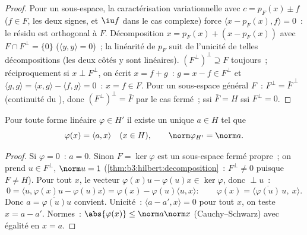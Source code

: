 \begin{proof}
Pour un sous-espace, la caractérisation variationnelle avec $c
= p_F(x) \pm f$ ($f \in F$, les deux signes, et $\iu f$ dans le
cas complexe) force $\langle x - p_F(x), f\rangle = 0$~: le
résidu est orthogonal à $F$. Décomposition $x = p_F(x) + (x
- p_F(x))$ avec $F \cap F^\perp = \{0\}$ ($\langle y, y
\rangle = 0$)~; la linéarité de $p_F$ suit de l'unicité de
telles décompositions (les deux côtés y sont linéaires).
$(F^\perp)^\perp \supseteq F$ toujours~; réciproquement si $x
\perp F^\perp$, on écrit $x = f + g$~: $g = x - f \in
F^\perp$ et $\langle g, g\rangle = \langle x, g\rangle -
\langle f, g\rangle = 0$~: $x = f \in F$. Pour un sous-espace
général $F$~: $F^\perp = \bar F^{\,\perp}$ (continuité du
), donc $(F^\perp)^\perp = \bar F$ par le cas
fermé~;  ssi $\bar F = H$ ssi $F^\perp = 0$.
\end{proof}

\begin{theorem}\label{thm:b3:hilbert:riesz}
Pour toute forme linéaire  $\varphi \in H'$ il
existe un unique $a \in H$ tel que
\[
\varphi(x) = \langle a, x\rangle \quad (x \in H),
\qquad \norm\varphi_{H'} = \norm a .
\]
\end{theorem}

\begin{proof}
Si $\varphi = 0$~: $a = 0$. Sinon $F = \ker\varphi$ est un
sous-espace fermé propre~; on prend $u \in F^\perp$, $\norm u
= 1$ (\cref{thm:b3:hilbert:decomposition}~: $F^\perp \neq 0$
puisque $F \neq H$). Pour tout $x$, le vecteur $\varphi(x)u -
\varphi(u)x \in \ker\varphi$, donc $\perp u$~:
\[
0 = \langle u, \varphi(x)u - \varphi(u)x\rangle
= \varphi(x) - \varphi(u)\langle u, x\rangle :
\qquad \varphi(x) = \langle
\overline{\varphi(u)}\,u,\ x\rangle .
\]
Donc $a = \overline{\varphi(u)}u$ convient. Unicité~:
$\langle a - a', x\rangle = 0$ pour tout $x$, on teste $x = a
- a'$. Normes~: $\abs{\varphi(x)} \leq \norm a\norm x$
(Cauchy--Schwarz) avec égalité en $x = a$.
\end{proof}


